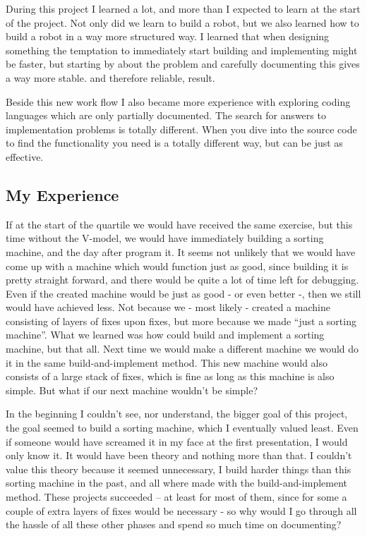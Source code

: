 During this project I learned a lot, and more than I expected to learn at the start of the project. Not only did we learn to build a robot, but we also learned how to build a robot in a way more structured way. I learned that when designing something the temptation to immediately start building and implementing might be faster, but starting by about the problem and carefully documenting this gives a way more stable. and therefore reliable, result.

Beside this new work flow I also became more experience with exploring coding languages which are only partially documented. The search for answers to implementation problems is totally different. When you dive into the source code to find the functionality you need is a totally different way, but can be just as effective.

\subsection{My Experience}
If at the start of the quartile we would have received the same exercise, but this time without the V-model, we would have immediately building a sorting machine, and the day after program it. It seems not unlikely that we would have come up with a machine which would function just as good, since building it is pretty straight forward, and there would be quite a lot of time left for debugging. Even if the created machine would be just as good - or even better -, then we still would have achieved less. Not because we - most likely - created a machine consisting of layers of fixes upon fixes, but more because we made ``just a sorting machine''. What we learned was how could build and implement a sorting machine, but that all. Next time we would make a different machine we would do it in the same build-and-implement method. This new machine would also consists of a large stack of fixes, which is fine as long as this machine is also simple. But what if our next machine wouldn't be simple?

In the beginning I couldn't see, nor understand, the bigger goal of this project, the goal seemed to build a sorting machine, which I eventually valued least. Even if someone would have screamed it in my face at the first presentation, I would only know it. It would have been theory and nothing more than that. I couldn't value this theory because it seemed unnecessary, I build harder things than this sorting machine in the past, and all where made with the build-and-implement method. These projects succeeded – at least for most of them, since for some a couple of extra layers of fixes would be necessary - so why would I go through all the hassle of all these other phases and spend so much time on documenting?

